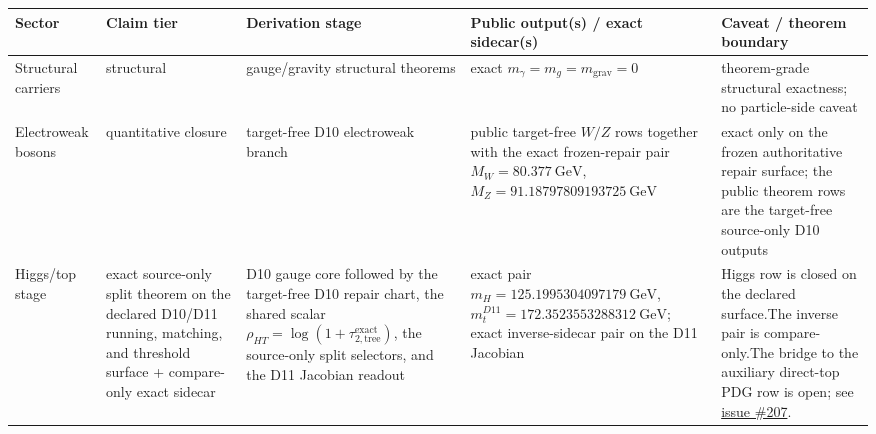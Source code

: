 \documentclass[11pt]{article}
\begin{document}
\begin{table}[h]
\centering
\tiny
\setlength{\tabcolsep}{2pt}
\begin{tabular}{@{}>{\raggedright\arraybackslash}p{}>{\raggedright\arraybackslash}p{}>{\raggedright\arraybackslash}p{}>{\raggedright\arraybackslash}p{}>{\raggedright\arraybackslash}p{}@{}}
\toprule
Sector & Claim tier & Derivation stage & Public output(s) / exact sidecar(s) & Caveat / theorem boundary \\
\midrule
Structural carriers & structural & gauge/gravity structural theorems & exact \(m_\gamma=m_g=m_{\mathrm{grav}}=0\) & theorem-grade structural exactness; no particle-side caveat \\
Electroweak bosons & quantitative closure & target-free D10 electroweak branch & public target-free \(W/Z\) rows together with the exact frozen-repair pair \(M_W=80.377~\mathrm{GeV}\), \(M_Z=91.18797809193725~\mathrm{GeV}\) & exact only on the frozen authoritative repair surface; the public theorem rows are the target-free source-only D10 outputs \\
Higgs/top stage & exact source-only split theorem on the declared D10/D11 running, matching, and threshold surface + compare-only exact sidecar & D10 gauge core followed by the target-free D10 repair chart, the shared scalar \(\rho_{HT}=\log(1+\tau_{2,\mathrm{tree}}^{\mathrm{exact}})\), the source-only split selectors, and the D11 Jacobian readout & exact pair \(m_H=125.1995304097179~\mathrm{GeV}\), \(m_t^{D11}=172.3523553288312~\mathrm{GeV}\); exact inverse-sidecar pair on the D11 Jacobian & Higgs row is closed on the declared surface.\newline The inverse pair is compare-only.\newline The bridge to the auxiliary direct-top PDG row is open; see \href{https://github.com/FloatingPragma/observer-patch-holography/issues/207}{issue \#207}. \\

\end{tabular}
\end{table}
\end{document}
